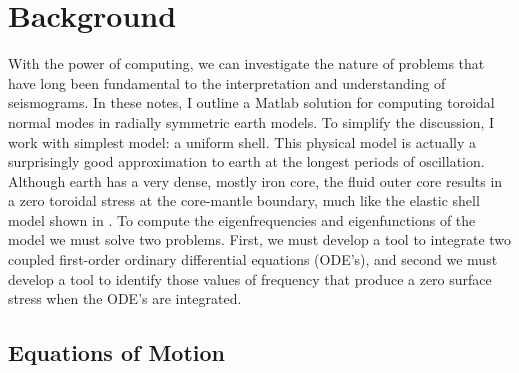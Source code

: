\documentclass[11pt,titlepage,fleqn]{article}
\begin{document}

\clearpage\pagebreak
\section{Background}

With the power of computing, we can investigate the nature of problems that have long been fundamental to the interpretation and understanding of seismograms. In these notes, I outline a Matlab solution for computing toroidal normal modes in radially symmetric earth models. To simplify the discussion, I work with simplest model: a uniform shell. This physical model is actually a surprisingly good approximation to earth at the longest periods of oscillation. Although earth has a very dense, mostly iron core, the fluid outer core results in a zero toroidal stress at the core-mantle boundary, much like the elastic shell model shown in . To compute the eigenfrequencies and eigenfunctions of the model we must solve two problems. First, we must develop a tool to integrate two coupled first-order ordinary differential equations (ODE's), and second we must develop a tool to identify those values of frequency that produce a zero surface stress when the ODE's are integrated.

\subsection*{Equations of Motion}
\end{document}
